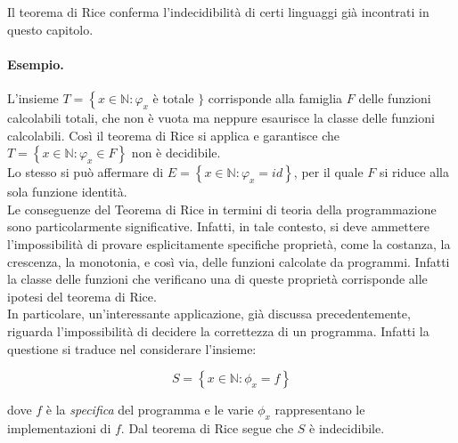 Il teorema di Rice conferma
l'indecidibilità di certi linguaggi già incontrati in questo capitolo.

\paragraph{Esempio.}
L'insieme $T=\left\{x \in \mathbb{N}: \varphi_x\right.$ è totale $\}$
corrisponde alla famiglia $F$ delle funzioni calcolabili totali, che non è vuota
ma neppure esaurisce la classe delle funzioni calcolabili. Così il teorema di
Rice si applica e garantisce che $T=\left\{x \in \mathbb{N}: \varphi_x \in
    F\right\}$ non è decidibile.\\
Lo stesso si può affermare di $E=\left\{x \in
    \mathbb{N}: \varphi_x=i d\right\}$, per il quale $F$ si riduce alla sola
funzione identità.\\

Le conseguenze del Teorema di Rice in termini di teoria della programmazione
sono particolarmente significative. Infatti, in tale contesto, si deve ammettere
l'impossibilità di provare esplicitamente specifiche proprietà, come la
costanza, la crescenza, la monotonia, e così via, delle funzioni calcolate da
programmi. Infatti la classe delle funzioni che verificano una di queste
proprietà corrisponde alle ipotesi del teorema di Rice.\\
In particolare,
un'interessante applicazione, già discussa precedentemente, riguarda
l'impossibilità di decidere la correttezza di un programma. Infatti la questione
si traduce nel considerare l'insieme:

\[
    S=\left\{x \in \mathbb{N}: \phi_x=f\right\}
\]

dove $f$ è la \textit{specifica} del programma e le varie $\phi_x$ rappresentano le
implementazioni di $f$. Dal teorema di Rice segue che $S$ è indecidibile.
